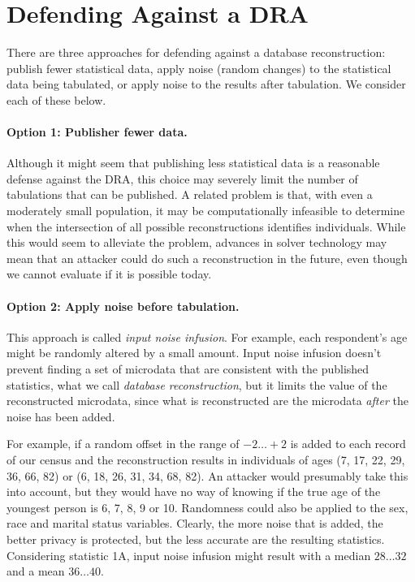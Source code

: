 \documentclass[runningheads]{llncs}
\begin{document}
\section{Defending Against a DRA}\label{solution}
There are three approaches for defending against a database reconstruction: publish fewer
statistical data, apply noise (random changes) to the
statistical data being tabulated, or apply noise to the results after
tabulation. We consider each of these below.

\paragraph{Option 1: Publisher fewer data.} Although it might seem that publishing less statistical data is a
reasonable defense against the DRA, this choice may severely limit the
number of tabulations that can be published. A related problem is
that, with even a moderately small population, it may be
computationally infeasible to determine when the intersection of all
possible reconstructions identifies individuals. While this would seem
to alleviate the problem, advances in solver technology may mean that
an attacker could do such a reconstruction in the future, even though
we cannot evaluate if it is possible today.

\paragraph{Option 2: Apply noise before tabulation.} This approach is called \emph{input noise infusion}. For example, each respondent's age might be randomly
altered by a small amount. Input noise infusion
doesn't prevent finding a set of microdata that are consistent with
the published statistics, what we call \emph{database reconstruction}, but it limits the value of
the reconstructed microdata, since what is reconstructed are the
microdata \emph{after} the noise has been added. 

For example, if a random offset in the range of $-2 \ldots +2$ is
added to each record of our census and the reconstruction results in individuals of
ages (7, 17, 22, 29, 36, 66, 82) or (6, 18, 26, 31, 34, 68,
82). An attacker would presumably take this into account, but they
would have no way of knowing if the true age of the youngest person is
6, 7, 8, 9 or 10. Randomness could also be applied to the sex, race
and marital status variables. Clearly, the more noise that is added,
the better privacy is protected, but the less accurate are the
resulting statistics. Considering statistic 1A, input noise infusion
might result with a median $28\ldots32$ and a mean $36\ldots40$. 
\end{document}
